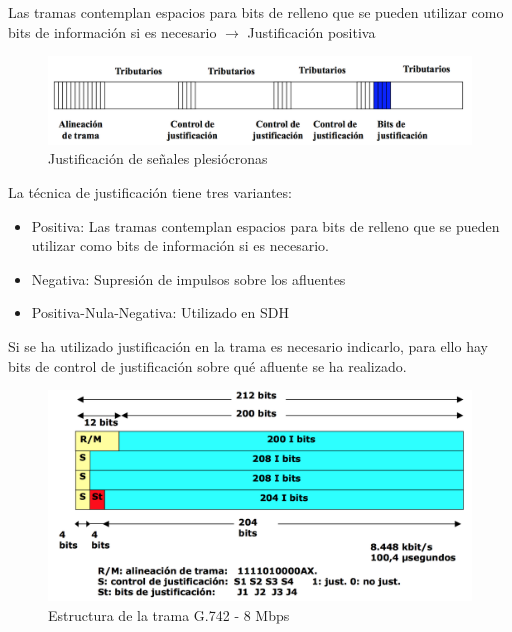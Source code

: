 \documentclass[10pt,portrait, twocolumn]{article}
\makeatletter
\renewcommand{\subsubsection}{\@startsection{subsubsection}{3}{0mm}%
                                {-1ex plus -.5ex minus -.2ex}%
                                {1ex plus .2ex}%
                                {\normalfont\small\bfseries}}
\makeatother
\begin{document}
Las tramas contemplan espacios para bits de relleno que se pueden utilizar como bits de información si es necesario $\rightarrow$ Justificación positiva
	
	
	\begin{figure}[!ht]
 		\centering
  		 \includegraphics[scale = 0.35]{images/Relleno}
		\caption{Justificación de señales plesiócronas}
	\end{figure}
	

La técnica de justificación tiene tres variantes: 

	\begin{itemize}
		\item Positiva: Las tramas contemplan espacios para bits de relleno que se pueden utilizar como bits de información si es necesario.
		\item Negativa: Supresión de impulsos sobre los afluentes
		\item Positiva-Nula-Negativa: Utilizado en SDH
	\end{itemize}
	
Si se ha utilizado justificación en la trama es necesario indicarlo, para ello hay bits de control de justificación sobre qué afluente se ha realizado.

	

	\begin{figure}[!ht]
 		\centering
  		 \includegraphics[scale = 0.3]{images/TramaG742}
		\caption{Estructura de la trama G.742 - 8 Mbps}
	\end{figure}
	
\end{document}
